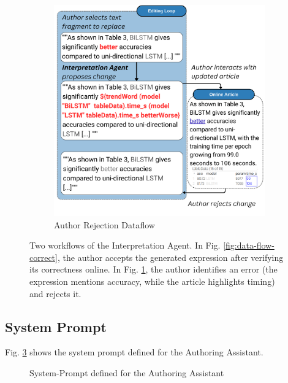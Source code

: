 \begin{figure}[ht]
\begin{subfigure}{0.50\linewidth}
        \includegraphics[width=\linewidth]{fig/data-flow-error}
        \caption{Author Rejection Dataflow}
        \label{fig:dataflow-error}
    \end{subfigure}
    \caption{Two workflows of the Interpretation Agent. In Fig. \ref{fig:data-flow-correct}, the author accepts the generated expression after verifying its correctness online. In Fig. \ref{fig:dataflow-error}, the author identifies an error (the expression mentions accuracy, while the article highlights timing) and rejects it.}
    \label{fig:overall-architecture}
\end{figure}


\subsection{System Prompt}
\label{subsec:system-prompt}
Fig. \ref{fig:system-prompt} shows the system prompt defined for the Authoring Assistant.

\begin{figure}[h]
    \centering
    \begin{tcolorbox}[colback=gray!10, colframe=gray!50, boxrule=0.5pt, arc=2pt,
        left=6pt, right=6pt, top=4pt, bottom=4pt]
    \end{tcolorbox}
    \vspace{-0.5em}
    \caption{System-Prompt defined for the Authoring Assistant}
    \label{fig:system-prompt}
\end{figure}


